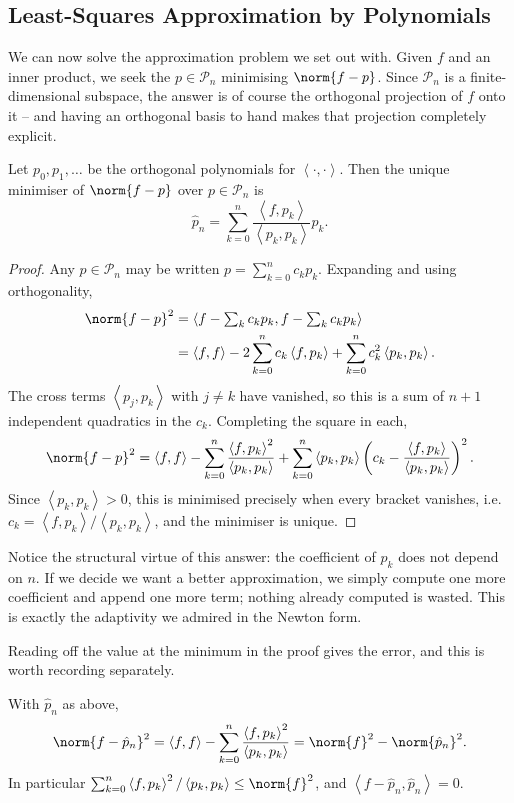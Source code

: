\documentclass[a4paper]{scrartcl}
\newcommand{\ip}[2]{\left\langle #1, #2 \right\rangle}
\newcommand{\Pn}[1]{\mathcal{P}_{#1}}
\begin{document}
\subsection{Least-Squares Approximation by Polynomials}

We can now solve the approximation problem we set out with. Given $f$ and an inner product, we seek the $p \in \Pn{n}$ minimising $\norm{f - p}$. Since $\Pn{n}$ is a finite-dimensional subspace, the answer is of course the orthogonal projection of $f$ onto it -- and having an orthogonal basis to hand makes that projection completely explicit.

\begin{theorem}\label{thm:lsq}
  Let $p_0, p_1, \dots$ be the orthogonal polynomials for $\ip{\cdot}{\cdot}$. Then the unique minimiser of $\norm{f - p}$ over $p \in \Pn{n}$ is
  $$
  \hat p_n = \sum_{k=0}^{n}\frac{\ip{f}{p_k}}{\ip{p_k}{p_k}}p_k.
  $$
\end{theorem}
\begin{proof}
  Any $p \in \Pn{n}$ may be written $p = \sum_{k=0}^n c_k p_k$. Expanding and using orthogonality,
  \begin{align*}
    \norm{f - p}^2 &= \ip{f - \textstyle\sum_k c_kp_k}{f - \textstyle\sum_k c_kp_k}\\
    &= \ip{f}{f} - 2\sum_{k=0}^n c_k \ip{f}{p_k} + \sum_{k=0}^n c_k^2 \ip{p_k}{p_k}.
  \end{align*}
  The cross terms $\ip{p_j}{p_k}$ with $j \neq k$ have vanished, so this is a sum of $n+1$ independent quadratics in the $c_k$. Completing the square in each,
  $$
  \norm{f-p}^2 = \ip{f}{f} - \sum_{k=0}^n \frac{\ip{f}{p_k}^2}{\ip{p_k}{p_k}} + \sum_{k=0}^n \ip{p_k}{p_k}\left(c_k - \frac{\ip{f}{p_k}}{\ip{p_k}{p_k}}\right)^2 .
  $$
  Since $\ip{p_k}{p_k} > 0$, this is minimised precisely when every bracket vanishes, i.e.\ $c_k = \ip{f}{p_k}/\ip{p_k}{p_k}$, and the minimiser is unique.
\end{proof}

Notice the structural virtue of this answer: the coefficient of $p_k$ does not depend on $n$. If we decide we want a better approximation, we simply compute one more coefficient and append one more term; nothing already computed is wasted. This is exactly the adaptivity we admired in the Newton form.

Reading off the value at the minimum in the proof gives the error, and this is worth recording separately.

\begin{corollary}
  With $\hat p_n$ as above,
  $$
  \norm{f - \hat p_n}^2 = \ip{f}{f} - \sum_{k=0}^n \frac{\ip{f}{p_k}^2}{\ip{p_k}{p_k}} = \norm{f}^2 - \norm{\hat p_n}^2 .
  $$
  In particular $\sum_{k=0}^n \ip{f}{p_k}^2/\ip{p_k}{p_k} \leq \norm{f}^2$, and $\ip{f - \hat p_n}{\hat p_n} = 0$.
\end{corollary}
\end{document}
